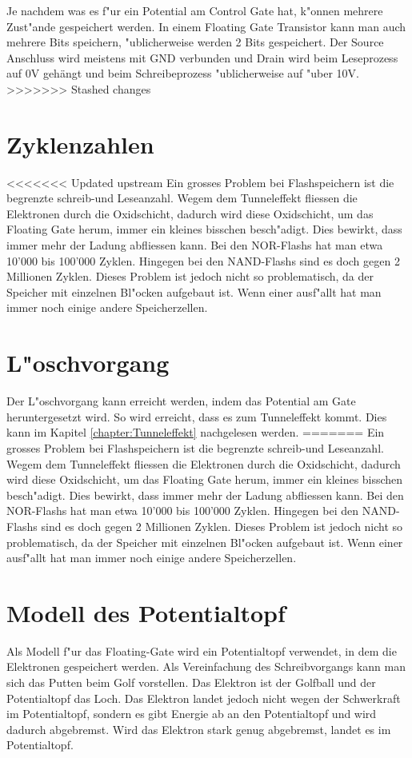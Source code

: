 \begin{refsection}
Je nachdem was es f"ur ein Potential am Control Gate hat, k"onnen mehrere Zust"ande gespeichert werden. In einem Floating Gate Transistor kann man auch mehrere Bits speichern, "ublicherweise werden 2 Bits gespeichert. 
Der Source Anschluss wird meistens mit GND verbunden und Drain wird beim Leseprozess auf 0V gehängt und beim Schreibeprozess "ublicherweise auf "uber 10V. 
>>>>>>> Stashed changes


\section{Zyklenzahlen}
<<<<<<< Updated upstream
Ein grosses Problem bei Flashspeichern ist die begrenzte schreib-und
Leseanzahl. Wegem dem Tunneleffekt fliessen die Elektronen durch die
Oxidschicht, dadurch wird diese Oxidschicht, um das Floating Gate herum,
immer ein kleines bisschen besch"adigt. Dies bewirkt, dass immer mehr
der Ladung abfliessen kann. Bei den NOR-Flashs hat man etwa 10'000
bis 100'000 Zyklen. Hingegen bei den NAND-Flashs sind es doch gegen 2
Millionen Zyklen. Dieses Problem ist jedoch nicht so problematisch, da
der Speicher mit einzelnen Bl"ocken aufgebaut ist. Wenn einer ausf"allt
hat man immer noch einige andere Speicherzellen.


\section{L"oschvorgang}
Der L"oschvorgang kann erreicht werden, indem das Potential am Gate
heruntergesetzt wird. So wird erreicht, dass es zum Tunneleffekt
kommt. Dies kann im Kapitel \ref{chapter:Tunneleffekt} nachgelesen werden.
=======
Ein grosses Problem bei Flashspeichern ist die begrenzte schreib-und Leseanzahl. Wegem dem Tunneleffekt fliessen die Elektronen durch die Oxidschicht, dadurch wird diese Oxidschicht, um das Floating Gate herum, immer ein kleines bisschen besch"adigt. Dies bewirkt, dass immer mehr der Ladung abfliessen kann. Bei den NOR-Flashs hat man etwa 10'000 bis 100'000 Zyklen. Hingegen bei den NAND-Flashs sind es doch gegen 2 Millionen Zyklen. Dieses Problem ist jedoch nicht so problematisch, da der Speicher mit einzelnen Bl"ocken aufgebaut ist. Wenn einer ausf"allt hat man immer noch einige andere Speicherzellen.

\section{Modell des Potentialtopf}
Als Modell f"ur das Floating-Gate wird ein Potentialtopf verwendet, in dem die Elektronen gespeichert werden.
Als Vereinfachung des Schreibvorgangs kann man sich das Putten beim Golf vorstellen. Das Elektron ist der Golfball und der Potentialtopf das Loch. Das Elektron landet jedoch nicht wegen der Schwerkraft im Potentialtopf, sondern es gibt Energie ab an den Potentialtopf und wird dadurch abgebremst. Wird das Elektron stark genug abgebremst, landet es im Potentialtopf.


\end{refsection}

